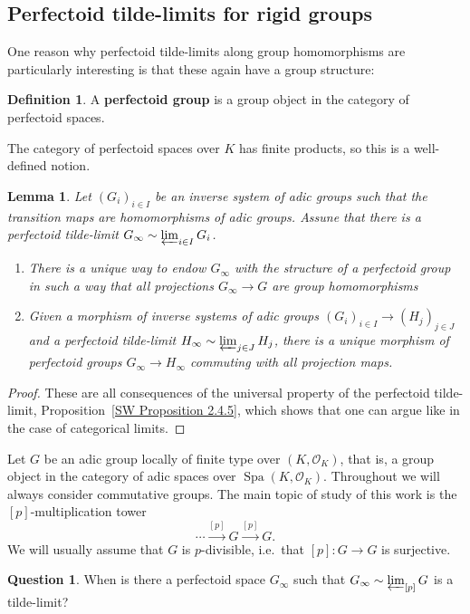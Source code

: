 \documentclass[10pt,oneside]{amsart}
\newtheorem{lemma}[theorem]{Lemma}
\theoremstyle{definition}
\newtheorem{definition}[theorem]{Definition}
\newtheorem{question}[theorem]{Question}
\newcommand{\Spa}{\operatorname{Spa}}
\renewcommand{\O}{\mathcal{O}}
\begin{document}
\subsection{Perfectoid tilde-limits for rigid groups}

One reason why perfectoid tilde-limits along group homomorphisms are particularly interesting is that these again have a group structure:

\begin{definition}
	A \textbf{perfectoid group} is a group object in the category of perfectoid spaces.
\end{definition}
The category of perfectoid spaces over $K$ has finite products, so this is a well-defined notion.

\begin{lemma}\label{perfectoid tilde-limit is perfectoid group in a functorial way}
	Let $(G_i)_{i\in I}$ be an inverse system of adic groups such that the transition maps are homomorphisms of adic groups. Assune that there is a perfectoid tilde-limit $G_\infty\sim \varprojlim_{i\in I}G_i$.
	\begin{enumerate}
		\item  There is a unique way to endow $G_\infty$ with the structure of a perfectoid group in such a way that all projections $G_\infty\rightarrow G$ are group homomorphisms
		\item Given a morphism of inverse systems of adic groups $(G_i)_{i\in I}\to (H_j)_{j\in J}$ and a perfectoid tilde-limit $H_\infty\sim\varprojlim_{j\in J}H_j$, there is a unique morphism of perfectoid groups $G_\infty\rightarrow H_\infty$
		commuting with all projection maps.
	\end{enumerate}
\end{lemma}
\begin{proof}
	These are all consequences of the universal property of the perfectoid tilde-limit, Proposition~\ref{SW Proposition 2.4.5}, which shows that one can argue like in the case of categorical limits.
\end{proof}

Let $G$ be an adic group locally of finite type over $(K,\O_K)$, that is, a group object in the category of adic spaces over $\Spa(K,\O_K)$. Throughout we will always consider commutative groups. The main topic of study of this work is the $[p]$-multiplication tower
\[ \cdots\xrightarrow{[p]}G\xrightarrow{[p]}G.\]
We will usually assume that $G$ is $p$-divisible, i.e.\ that $[p]\colon G\to G$ is surjective.
\begin{question}\label{qu:tilde-limits-of-adic-groups}
	When is there a perfectoid space $G_\infty$ such that $G_\infty \sim \varprojlim_{[p]} G$ is a tilde-limit?
\end{question}
\end{document}
